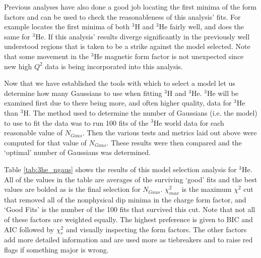 Previous analyses have also done a good job locating the first minima of the form factors and can be used to check the reasonableness of this analysis' fits. For example \cite{Article:Amroun} locates the first minima of both $^3$H and $^3$He fairly well, and \cite{Article:Alex} does the same for $^3$He. If this analysis' results diverge significantly in the previously well understood regions that is taken to be a strike against the model selected. Note that some movement in the $^3$He magnetic form factor is not unexpected since new high $Q^2$ data is being incorporated into this analysis.

Now that we have established the tools with which to select a model let us determine how many Gaussians to use when fitting $^3$H and $^3$He. $^3$He will be examined first due to there being more, and often higher quality, data for $^3$He than $^3$H. The method used to determine the number of Gaussians (i.e. the model) to use to fit the data was to run 100 fits of the $^3$He world data for each reasonable value of $N_{Gaus}$. Then the various tests and metrics laid out above were computed for that value of $N_{Gaus}$. These results were then compared and the `optimal' number of Gaussians was determined.

Table \ref{tab:3he_ngaus} shows the results of this model selection analysis for $^3$He. All of the values in the table are averages of the surviving `good' fits and the best values are bolded as is the final selection for $N_{Gaus}$. $\chi^2_{max}$ is the maximum $\chi^2$ cut that removed all of the nonphysical dip minima in the charge form factor, and `Good Fits' is the number of the 100 fits that survived this cut. Note that not all of these factors are weighted equally. The highest preference is given to BIC and AIC followed by $\chi^2_r$ and visually inspecting the form factors. The other factors add more detailed information and are used more as tiebreakers and to raise red flags if something major is wrong.

